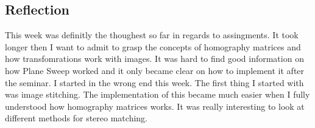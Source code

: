 \documentclass{article}
\begin{document}
    \subsection{Reflection}
    This week was definitly the thoughest so far in regards to assingments. It took longer then I want to admit
    to grasp the concepts of homography matrices and how transfomrations work with images. It was hard to find good
    information on how Plane Sweep worked and it only became clear on how to implement it after the seminar. I started
    in the wrong end this week. The first thing I started with was image stitching. The implementation of this became 
    much easier when I fully understood how homography matrices works. It was really interesting to look at different
    methods for stereo matching.
    
    \newpage
    \printbibliography
\end{document}
